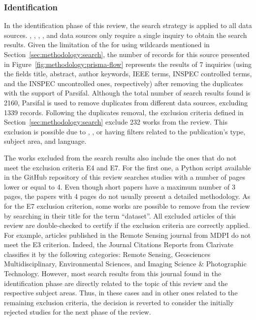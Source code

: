\subsubsection{Identification}

In the identification phase of this review, the search strategy is applied to all data sources. , , , , and  data sources only require a single inquiry to obtain the search results.
Given the limitation of the  for using wildcards mentioned in Section~\ref{sec:methodology:search}, the number of records for this source presented in Figure~\ref{fig:methodology:prisma-flow} represents the results of 7 inquiries (using the fields title, abstract, author keywords, IEEE terms, INSPEC controlled terms, and the INSPEC uncontrolled ones, respectively) after removing the duplicates with the support of Parsifal. Although the total number of search results found is 2160, Parsifal is used to remove duplicates from different data sources, excluding 1339 records. Following the duplicates removal, the exclusion criteria defined in Section~\ref{sec:methodology:search} exclude 232 works from the review. This exclusion is possible due to , , or  having filters related to the publication's type, subject area, and language.

The works excluded from the search results also include the ones that do not meet the exclusion criteria E4 and E7. For the first one, a Python script available in the GitHub repository of this review searches studies with a number of pages lower or equal to 4. Even though short papers have a maximum number of 3 pages, the papers with 4 pages do not usually present a detailed methodology.
As for the E7 exclusion criterion, some works are possible to remove from the review by searching in their title for the term ``dataset''.
All excluded articles of this review are double-checked to certify if the exclusion criteria are correctly applied. For example, articles published in the Remote Sensing journal from MDPI do not meet the E3 criterion. Indeed, the Journal Citations Reports from Clarivate classifies it by the following categories: Remote Sensing, Geosciences Multidisciplinary, Environmental Sciences, and Imaging Science \& Photographic Technology. However, most search results from this journal found in the identification phase are directly related to the topic of this review and the respective subject areas. Thus, in these cases and in other ones related to the remaining exclusion criteria, the decision is reverted to consider the initially rejected studies for the next phase of the review.

